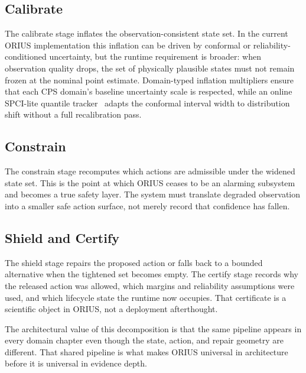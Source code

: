 \subsection{Calibrate}
The calibrate stage inflates the observation-consistent state set. In the current ORIUS
implementation this inflation can be driven by conformal or reliability-conditioned
uncertainty, but the runtime requirement is broader: when observation quality drops, the
set of physically plausible states must not remain frozen at the nominal point estimate.
Domain-typed inflation multipliers ensure that each CPS domain's baseline uncertainty
scale is respected, while an online SPCI-lite quantile tracker~\cite{gibbs2021adaptive}
adapts the conformal interval width to distribution shift without a full recalibration
pass.

\subsection{Constrain}
The constrain stage recomputes which actions are admissible under the widened state set.
This is the point at which ORIUS ceases to be an alarming subsystem and becomes a true
safety layer. The system must translate degraded observation into a smaller safe action
surface, not merely record that confidence has fallen.

\subsection{Shield and Certify}
The shield stage repairs the proposed action or falls back to a bounded alternative when
the tightened set becomes empty. The certify stage records why the released action was
allowed, which margins and reliability assumptions were used, and which lifecycle state
the runtime now occupies. That certificate is a scientific object in ORIUS, not a
deployment afterthought.

The architectural value of this decomposition is that the same pipeline appears in every
domain chapter even though the state, action, and repair geometry are different. That
shared pipeline is what makes ORIUS universal in architecture before it is universal in
evidence depth.
